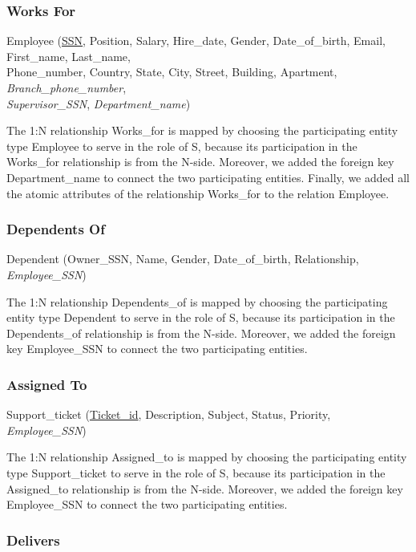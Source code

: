 \subsubsection{Works For}

Employee (\underline{SSN}, Position, Salary, Hire\_date, Gender, Date\_of\_birth, Email, First\_name, Last\_name, \\
Phone\_number, Country, State, City, Street, Building, Apartment, \textit{Branch\_phone\_number}, \\
\textit{Supervisor\_SSN}, \textit{Department\_name})

The 1:N relationship Works\_for is mapped by choosing the participating entity type Employee to serve in the role of S, because its participation in the Works\_for relationship is from the N-side. Moreover, we added the foreign key Department\_name to connect the two participating entities. Finally, we added all the atomic attributes of the relationship Works\_for to the relation Employee.

\subsubsection{Dependents Of}

Dependent (Owner\_SSN, Name, Gender, Date\_of\_birth, Relationship, \textit{Employee\_SSN})

The 1:N relationship Dependents\_of is mapped by choosing the participating entity type Dependent to serve in the role of S, because its participation in the Dependents\_of relationship is from the N-side. Moreover, we added the foreign key Employee\_SSN to connect the two participating entities.

\subsubsection{Assigned To}

Support\_ticket (\underline{Ticket\_id}, Description, Subject, Status, Priority, \textit{Employee\_SSN})

The 1:N relationship Assigned\_to is mapped by choosing the participating entity type Support\_ticket to serve in the role of S, because its participation in the Assigned\_to relationship is from the N-side. Moreover, we added the foreign key Employee\_SSN to connect the two participating entities.

\subsubsection{Delivers}

